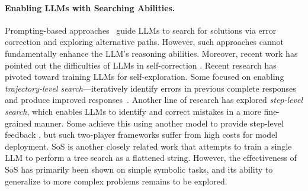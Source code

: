 \paragraph{Enabling LLMs with Searching Abilities.}
Prompting-based approaches~\cite{yao2024tree, shinn2024reflexion, hao2023reasoning, qi2024mutual} guide LLMs to search for solutions via error correction and exploring alternative paths. However, such approaches cannot fundamentally enhance the LLM's reasoning abilities. Moreover, recent work has pointed out the difficulties of LLMs in self-correction \cite{zhang2024small, kamoi2024can}. Recent research has pivoted toward training LLMs for self-exploration. Some focused on enabling \textit{trajectory-level search}---iteratively identify errors in previous complete responses and produce improved responses~\cite{saunders2022self, kumar2024training, qu2024recursive, havrilla2024glore}. Another line of research has explored \textit{step-level search}, which enables LLMs to identify and correct mistakes in a more fine-grained manner. Some achieve this using another model to provide step-level feedback \cite{xi2024enhancing, rewardingprogress, generativeverifiers, rstarmath, restmcts}, but such two-player frameworks suffer from high costs for model deployment. SoS \cite{gandhi2024stream} is another closely related work that attempts to train a single LLM to perform a tree search as a flattened string. However, the effectiveness of SoS has primarily been shown on simple symbolic tasks, and its ability to generalize to more complex problems remains to be explored. 